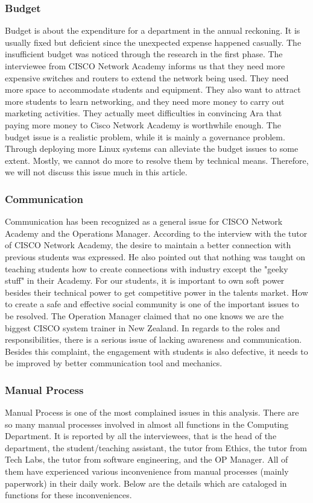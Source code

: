 \subsubsection{Budget}
Budget is about the expenditure for a department in the annual reckoning. It is usually fixed but deficient since the unexpected expense happened casually. The insufficient budget was noticed through the research in the first phase. The interviewee from CISCO Network Academy informs us that they need more expensive switches and routers to extend the network being used. They need more space to accommodate students and equipment. They also want to attract more students to learn networking, and they need more money to carry out marketing activities. They actually meet difficulties in convincing Ara that paying more money to Cisco Network Academy is worthwhile enough. The budget issue is a realistic problem, while it is mainly a governance problem. Through deploying more Linux systems can alleviate the budget issues to some extent. Mostly, we cannot do more to resolve them by technical means. Therefore, we will not discuss this issue much in this article.

\subsubsection{Communication}
Communication has been recognized as a general issue for CISCO Network Academy and the Operations Manager. According to the interview with the tutor of CISCO Network Academy, the desire to maintain a better connection with previous students was expressed. He also pointed out that nothing was taught on teaching students how to create connections with industry except the "geeky stuff" in their Academy. For our students, it is important to own soft power besides their technical power to get competitive power in the talents market. How to create a safe and effective social community is one of the important issues to be resolved. The Operation Manager claimed that no one knows we are the biggest CISCO system trainer in New Zealand. In regards to the roles and responsibilities, there is a serious issue of lacking awareness and communication. Besides this complaint, the engagement with students is also defective, it needs to be improved by better communication tool and mechanics.

\subsubsection{Manual Process}
Manual Process is one of the most complained issues in this analysis. There are so many manual processes involved in almost all functions in the Computing Department. It is reported by all the interviewees, that is the head of the department, the student/teaching assistant, the tutor from Ethics, the tutor from Tech Labs, the tutor from software engineering, and the OP Manager. All of them have experienced various inconvenience from manual processes (mainly paperwork) in their daily work. Below are the details which are cataloged in functions for these inconveniences.

